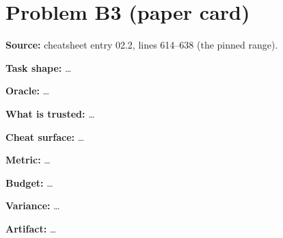 \documentclass[11pt]{article}
\begin{document}
\section*{Problem B3 (paper card)}\label{ans:B3}
\begin{answer}
\textbf{Source:} cheatsheet entry 02.2, lines 614--638 (the pinned range).

\textbf{Task shape:} \dots

\textbf{Oracle:} \dots

\textbf{What is trusted:} \dots

\textbf{Cheat surface:} \dots

\textbf{Metric:} \dots

\textbf{Budget:} \dots

\textbf{Variance:} \dots

\textbf{Artifact:} \dots
\end{answer}
\end{document}

